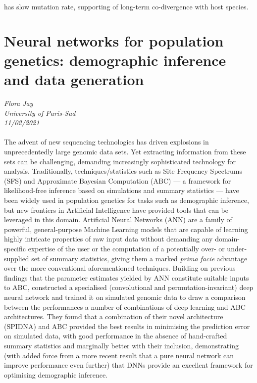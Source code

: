 \documentclass[11pt]{article}
\begin{document}
has slow mutation rate, supporting of long-term co-divergence with host species.


\section{Neural networks for population genetics: demographic inference and data generation}
\textit{Flora Jay\\University of Paris-Sud\\11/02/2021}
\\
\\The advent of new sequencing technologies has driven explosions in unprecedentedly large genomic data sets. Yet extracting information from these sets can be challenging, demanding increasingly sophisticated technology for analysis. Traditionally, techniques/statistics such as Site Frequency Spectrums (SFS) and Approximate Bayesian Computation (ABC) — a framework for likelihood-free inference based on simulations and summary statistics — have been widely used in population genetics for tasks such as demographic inference, but new frontiers in Artificial Intelligence have provided tools that can be leveraged in this domain. Artificial Neural Networks (ANN) are a family of powerful, general-purpose Machine Learning models that are capable of learning highly intricate properties of raw input data without demanding any domain-specific expertise of the user or the computation of a potentially over- or under-supplied set of summary statistics, giving them a marked \emph{prima facie} advantage over the more conventional aforementioned techniques. Building on previous findings that the parameter estimates yielded by ANN constitute suitable inputs to ABC, \cite{sanchez2020deep} constructed a specialised (convolutional and permutation-invariant) deep neural network and trained it on simulated genomic data to draw a comparison between the performances a number of combinations of deep learning and ABC architectures. They found that a combination of their novel architecture (SPIDNA) and ABC provided the best results in minimising the prediction error on simulated data, with good performance in the absence of hand-crafted summary statistics and marginally better with their inclusion, demonstrating (with added force from a more recent result that a pure neural network can improve performance even further) that DNNs provide an excellent framework for optimising demographic inference.
\end{document}
